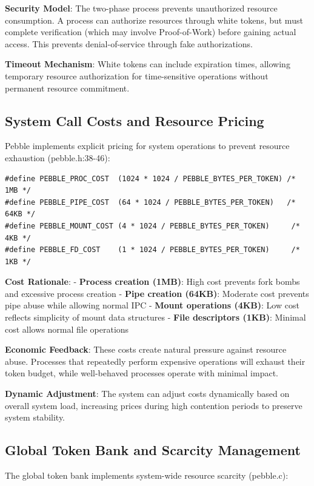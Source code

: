\documentclass[11pt,letterpaper]{article}
\begin{document}
\textbf{Security Model}: The two-phase process prevents unauthorized resource consumption. A process can authorize resources through white tokens, but must complete verification (which may involve Proof-of-Work) before gaining actual access. This prevents denial-of-service through fake authorizations.

\textbf{Timeout Mechanism}: White tokens can include expiration times, allowing temporary resource authorization for time-sensitive operations without permanent resource commitment.

\subsection{System Call Costs and Resource Pricing}

Pebble implements explicit pricing for system operations to prevent resource exhaustion (pebble.h:38-46):

\begin{lstlisting}
#define PEBBLE_PROC_COST  (1024 * 1024 / PEBBLE_BYTES_PER_TOKEN) /* 1MB */
#define PEBBLE_PIPE_COST  (64 * 1024 / PEBBLE_BYTES_PER_TOKEN)   /* 64KB */
#define PEBBLE_MOUNT_COST (4 * 1024 / PEBBLE_BYTES_PER_TOKEN)     /* 4KB */
#define PEBBLE_FD_COST    (1 * 1024 / PEBBLE_BYTES_PER_TOKEN)     /* 1KB */
\end{lstlisting}

\textbf{Cost Rationale}:
- \textbf{Process creation (1MB)}: High cost prevents fork bombs and excessive process creation
- \textbf{Pipe creation (64KB)}: Moderate cost prevents pipe abuse while allowing normal IPC
- \textbf{Mount operations (4KB)}: Low cost reflects simplicity of mount data structures
- \textbf{File descriptors (1KB)}: Minimal cost allows normal file operations

\textbf{Economic Feedback}: These costs create natural pressure against resource abuse. Processes that repeatedly perform expensive operations will exhaust their token budget, while well-behaved processes operate with minimal impact.

\textbf{Dynamic Adjustment}: The system can adjust costs dynamically based on overall system load, increasing prices during high contention periods to preserve system stability.

\subsection{Global Token Bank and Scarcity Management}

The global token bank implements system-wide resource scarcity (pebble.c):
\end{document}
